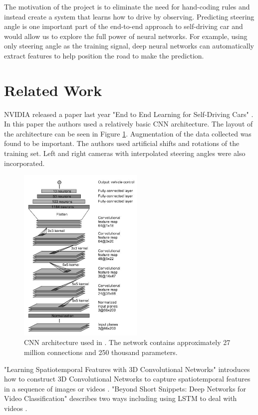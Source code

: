 \documentclass[10pt,twocolumn,letterpaper]{article}
\begin{document}
The motivation of the project is to eliminate the need for hand-coding rules and instead create a system that learns how to drive by observing. Predicting steering angle is one important part of the end-to-end approach to self-driving car and would allow us to explore the full power of neural networks. For example, using only steering angle as the training signal, deep neural networks can automatically extract features to help position the road to make the prediction.



\section{Related Work}

NVIDIA released a paper last year "End to End Learning for Self-Driving Cars" \cite{bojarski2016end}. In this paper the authors used a relatively basic CNN architecture. The layout of the architecture can be seen in Figure \ref{nvidiaimage}. Augmentation of the data collected was found to be important. The authors used artificial shifts and rotations of the training set. Left and right cameras with interpolated steering angles were also incorporated.
\begin{figure}[!htb]
	\includegraphics[width=6cm]{nvidiacnn}
	\centering
	\caption{CNN architecture used in \cite{bojarski2016end}. The network contains approximately 27 million connections and 250 thousand parameters.}
	\label{nvidiaimage}
\end{figure}


"Learning Spatiotemporal Features with 3D Convolutional Networks" introduces how to construct 3D Convolutional Networks to capture spatiotemporal features in a sequence of images or videos \cite{Tran_2015_ICCV}. "Beyond Short Snippets: Deep Networks for Video Classification" describes two ways including using LSTM to deal with videos \cite{yue2015beyond}.
\end{document}

